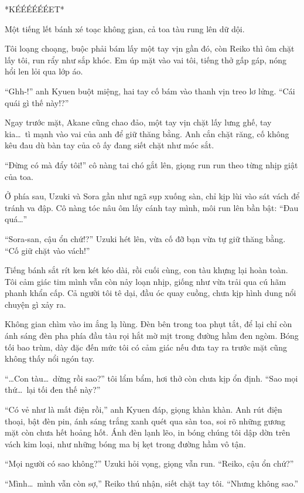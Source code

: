 \documentclass[../main.tex]{subfiles}
\begin{document}
*KÉÉÉÉÉÉET*

Một tiếng lết bánh xé toạc không gian, cả toa tàu rung lên dữ dội.


Tôi loạng choạng, buộc phải bám lấy một tay vịn gần đó, còn Reiko thì ôm chặt lấy tôi, run rẩy như sắp khóc. Em úp mặt vào vai tôi, tiếng thở gấp gáp, nóng hổi len lỏi qua lớp áo.

``Ghh-!'' anh Kyuen buột miệng, hai tay cố bám vào thanh vịn treo lơ lửng. ``Cái quái gì thế này!?''

Ngay trước mặt, Akane cũng chao đảo, một tay vịn chặt lấy lưng ghế, tay kia\dots\ tì mạnh vào vai của anh để giữ thăng bằng. Anh cắn chặt răng, cố không kêu đau dù bàn tay của cô ấy đang siết chặt như móc sắt.

``Đừng có mà đẩy tôi!'' cô nàng tai chó gắt lên, giọng run run theo từng nhịp giật của toa.

Ở phía sau, Uzuki và Sora gần như ngã sụp xuống sàn, chỉ kịp lùi vào sát vách để tránh va đập. Cô nàng tóc nâu ôm lấy cánh tay mình, môi run lên bần bật: ``Đau quá\dots''

``Sora-san, cậu ổn chứ!?'' Uzuki hét lên, vừa cố đỡ bạn vừa tự giữ thăng bằng. ``Cố giữ chặt vào vách!''

Tiếng bánh sắt rít ken két kéo dài, rồi cuối cùng, con tàu khựng lại hoàn toàn. Tôi cảm giác tim mình vẫn còn nảy loạn nhịp, giống như vừa trải qua cú hãm phanh khẩn cấp. Cả người tôi tê dại, đầu óc quay cuồng, chưa kịp hình dung nổi chuyện gì xảy ra.

Không gian chìm vào im ắng lạ lùng. Đèn bên trong toa phụt tắt, để lại chỉ còn ánh sáng đèn pha phía đầu tàu rọi hắt mờ mịt trong đường hầm đen ngòm. Bóng tối bao trùm, dày đặc đến mức tôi có cảm giác nếu đưa tay ra trước mặt cũng không thấy nổi ngón tay.

``\dots Con tàu\dots\ dừng rồi sao?'' tôi lẩm bẩm, hơi thở còn chưa kịp ổn định. ``Sao mọi thứ\dots\ lại tối đen thế này?''

``Có vẻ như là mất điện rồi,'' anh Kyuen đáp, giọng khàn khàn. Anh rút điện thoại, bật đèn pin, ánh sáng trắng xanh quét qua sàn toa, soi rõ những gương mặt còn chưa hết hoảng hốt. Ánh đèn lạnh lẽo, in bóng chúng tôi dập dờn trên vách kim loại, như những bóng ma bị kẹt trong đường hầm vô tận.

``Mọi người có sao không?'' Uzuki hỏi vọng, giọng vẫn run. ``Reiko, cậu ổn chứ?''

``Mình\dots\ mình vẫn còn sợ,'' Reiko thú nhận, siết chặt tay tôi. ``Nhưng không sao.''
\end{document}
